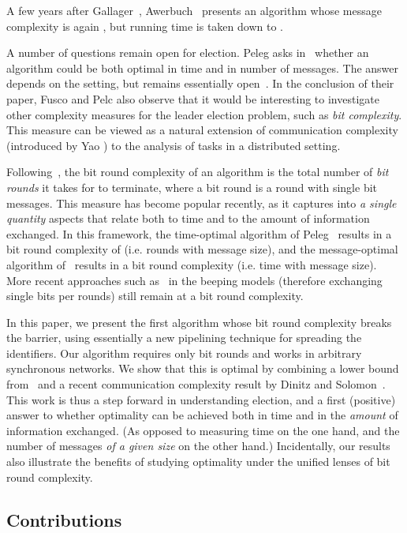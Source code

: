 \documentclass[11pt,envcountsame,letterpaper]{llncs}
\begin{document}
A few years after Gallager~\cite{Gallager}, Awerbuch~\cite{Awer87} presents an algorithm whose message complexity is again , but running time is taken down to .

A number of questions remain open for election. Peleg asks in~\cite{Peleg90}
whether an algorithm could be both optimal in time and in number of messages.
The answer depends on the setting, but remains essentially open~\cite{KPPRT15}.
In the conclusion of their paper, Fusco and Pelc \cite{FP15} also observe that
it would be interesting to investigate other complexity
measures for the leader election problem, such as {\em bit complexity}.
This measure can be viewed as a natural
extension of communication complexity (introduced by Yao \cite{Yao})
to the analysis of tasks in a distributed setting.

Following~\cite{KOSS}, the bit round complexity of an algorithm  is the total number of {\it bit rounds} it takes for  to terminate, where a bit round is a round with single bit messages. 
This measure has become popular recently, as it captures into {\em a single quantity} aspects that relate both to time and to the amount of information exchanged.
In this framework, the time-optimal algorithm of Peleg~\cite{Peleg90} results in a bit round complexity of  (i.e.  rounds with  message size), and the message-optimal algorithm of~\cite{Awer87} results in a  bit round complexity (i.e.  time with  message size). More recent approaches such as~\cite{FSW14} in the beeping models (therefore exchanging single bits per rounds) still remain at a  bit round complexity.

In this paper, we present the first algorithm whose bit round complexity breaks the  barrier, using essentially a new pipelining technique for spreading the identifiers. Our algorithm requires only  bit rounds and works in arbitrary synchronous networks. We show that this is optimal by combining a lower bound from~\cite{KPPRT15} and a recent communication complexity result by Dinitz and Solomon~\cite{DS07}.
This work is thus a step forward in understanding election, and a first (positive) answer to whether optimality can be
achieved
both in time and in the {\em amount} of information exchanged. (As opposed to measuring time on the one hand, and the number of messages {\em of a given size} on the other hand.) Incidentally, our results also
illustrate
the benefits of studying optimality under the unified lenses of bit round complexity.


\subsection{Contributions}
\end{document}
